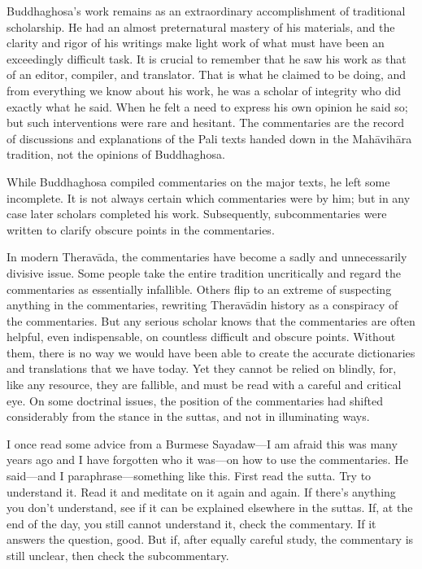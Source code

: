 \documentclass[12pt,openany]{book}%
\begin{document}
Buddhaghosa’s work remains as an extraordinary accomplishment of traditional scholarship. He had an almost preternatural mastery of his materials, and the clarity and rigor of his writings make light work of what must have been an exceedingly difficult task. It is crucial to remember that he saw his work as that of an editor, compiler, and translator. That is what he claimed to be doing, and from everything we know about his work, he was a scholar of integrity who did exactly what he said. When he felt a need to express his own opinion he said so; but such interventions were rare and hesitant. The commentaries are the record of discussions and explanations of the Pali texts handed down in the \textsanskrit{Mahāvihāra} tradition, not the opinions of Buddhaghosa.

While Buddhaghosa compiled commentaries on the major texts, he left some incomplete. It is not always certain which commentaries were by him; but in any case later scholars completed his work. Subsequently, subcommentaries were written to clarify obscure points in the commentaries.

In modern \textsanskrit{Theravāda}, the commentaries have become a sadly and unnecessarily divisive issue. Some people take the entire tradition uncritically and regard the commentaries as essentially infallible. Others flip to an extreme of suspecting anything in the commentaries, rewriting \textsanskrit{Theravādin} history as a conspiracy of the commentaries. But any serious scholar knows that the commentaries are often helpful, even indispensable, on countless difficult and obscure points. Without them, there is no way we would have been able to create the accurate dictionaries and translations that we have today. Yet they cannot be relied on blindly, for, like any resource, they are fallible, and must be read with a careful and critical eye. On some doctrinal issues, the position of the commentaries had shifted considerably from the stance in the suttas, and not in illuminating ways.

I once read some advice from a Burmese Sayadaw—I am afraid this was many years ago and I have forgotten who it was—on how to use the commentaries. He said—and I paraphrase—something like this. First read the sutta. Try to understand it. Read it and meditate on it again and again. If there’s anything you don’t understand, see if it can be explained elsewhere in the suttas. If, at the end of the day, you still cannot understand it, check the commentary. If it answers the question, good. But if, after equally careful study, the commentary is still unclear, then check the subcommentary.
\end{document}
